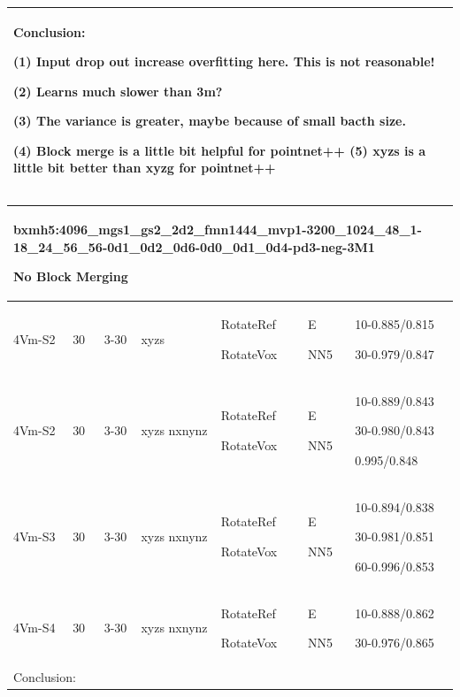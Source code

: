 \documentclass{article}
\begin{document}
\begin{tabular}{|p{1.5cm}|p{1.5cm}|p{1cm}|p{1.5cm}|p{1.5cm}|p{1.5cm}|p{5cm}| }
	\multicolumn{7}{|p{16cm}|}{ Conclusion:\par	
	(1) Input drop out increase overfitting here. This is not reasonable!\par
	(2) Learns much slower than 3m?\par 
	(3) The variance is greater, maybe because of small bacth size.\par 
	(4) Block merge is a little bit helpful for pointnet++
	(5) xyzs is a little bit better than xyzg for pointnet++ } \\
	\hline 
	
\end{tabular}

\noindent
\begin{tabular}{|p{1.5cm}|p{1.5cm}|p{1cm}|p{1.5cm}|p{1.5cm}|p{1.5cm}|p{5cm}| }
	\hline 
	\multicolumn{7}{|p{14cm}|}{bxmh5:4096\_mgs1\_gs2\_2d2\_fmn1444\_mvp1-3200\_1024\_48\_1-18\_24\_56\_56-0d1\_0d2\_0d6-0d0\_0d1\_0d4-pd3-neg-3M1\par No Block Merging }\\
	\hline
	4Vm-S2 & 30 & 3-30 & xyzs & RotateRef\par RotateVox & E\par NN5 & 10-0.885/0.815\par 30-0.979/0.847\\
	\hline
	4Vm-S2 & 30 & 3-30 & xyzs nxnynz & RotateRef\par RotateVox & E\par NN5 & 10-0.889/0.843\par 30-0.980/0.843\par 0.995/0.848\\
	\hline
	4Vm-S3 & 30 & 3-30 & xyzs nxnynz & RotateRef\par RotateVox & E\par NN5 & 10-0.894/0.838\par 30-0.981/0.851\par 60-0.996/0.853\\
	\hline
	4Vm-S4 & 30 & 3-30 & xyzs nxnynz & RotateRef\par RotateVox & E\par NN5 & 10-0.888/0.862\par 30-0.976/0.865\\
	\hline
	
	\multicolumn{7}{|p{16cm}|}{ Conclusion:\par	} \\
	\hline 
	
\end{tabular}
\end{document}
